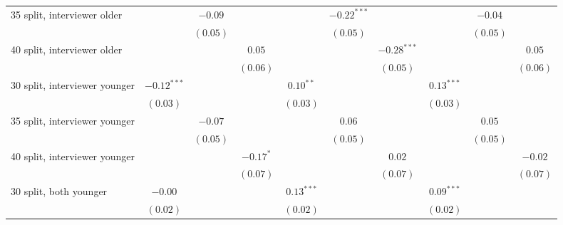 \begin{table}
\begin{center}
\begin{threeparttable}
\begin{tabular}{l c c c c c c c c c}
35 split, interviewer older     &               & $-0.09$       &               &               & $-0.22^{***}$ &               &               & $-0.04$       &               \\
                                &               & $(0.05)$      &               &               & $(0.05)$      &               &               & $(0.05)$      &               \\
40 split, interviewer older     &               &               & $0.05$        &               &               & $-0.28^{***}$ &               &               & $0.05$        \\
                                &               &               & $(0.06)$      &               &               & $(0.05)$      &               &               & $(0.06)$      \\
30 split, interviewer younger   & $-0.12^{***}$ &               &               & $0.10^{**}$   &               &               & $0.13^{***}$  &               &               \\
                                & $(0.03)$      &               &               & $(0.03)$      &               &               & $(0.03)$      &               &               \\
35 split, interviewer younger   &               & $-0.07$       &               &               & $0.06$        &               &               & $0.05$        &               \\
                                &               & $(0.05)$      &               &               & $(0.05)$      &               &               & $(0.05)$      &               \\
40 split, interviewer younger   &               &               & $-0.17^{*}$   &               &               & $0.02$        &               &               & $-0.02$       \\
                                &               &               & $(0.07)$      &               &               & $(0.07)$      &               &               & $(0.07)$      \\
30 split, both younger          & $-0.00$       &               &               & $0.13^{***}$  &               &               & $0.09^{***}$  &               &               \\
                                & $(0.02)$      &               &               & $(0.02)$      &               &               & $(0.02)$      &               &               \\

\end{tabular}
\end{threeparttable}
\end{center}
\end{table}
